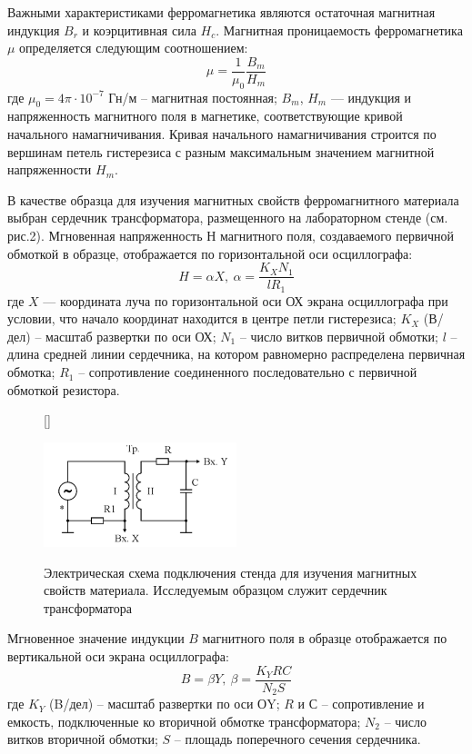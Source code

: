 \documentclass[12pt, a4paper]{article}
\begin{document}
Важными характеристиками ферромагнетика являются остаточная магнитная индукция $B_r$
и коэрцитивная сила $H_c$. Магнитная проницаемость ферромагнетика $\mu$ определяется
следующим соотношением:
\begin{equation}
\mu = \frac{1}{\mu_0}\frac{B_m}{H_m}
\end{equation}
где $\mu_0 = 4\pi \cdot 10^{-7}$ Гн/м – магнитная постоянная; $B_m$, $H_m$ —
индукция и напряженность магнитного поля в магнетике, соответствующие кривой
начального намагничивания. Кривая начального намагничивания строится по
вершинам петель гистерезиса с разным максимальным значением магнитной
напряженности $H_m$.

В качестве образца для изучения магнитных свойств ферромагнитного
материала выбран сердечник трансформатора, размещенного на лабораторном
стенде (см. рис.2). Мгновенная напряженность $Н$ магнитного поля,
создаваемого первичной обмоткой в образце, отображается по горизонтальной
оси осциллографа:
\begin{equation}
H = \alpha X,\ \alpha = \frac{K_X N_1}{l R_1}
\end{equation}
где $X$ — координата луча по горизонтальной оси ОХ экрана осциллографа при условии,
что начало координат находится в центре петли гистерезиса; $K_X$ (В/дел) – масштаб
развертки по оси ОХ; $N_1$ – число витков первичной обмотки; $l$ – длина
средней линии сердечника, на котором равномерно распределена первичная обмотка;
$R_1$ – сопротивление соединенного последовательно с первичной обмоткой резистора.

\begin{figure}[H]
[\FBwidth]
{\caption{Электрическая схема подключения стенда для изучения магнитных свойств материала.
Исследуемым образцом служит сердечник трансформатора}}
{\includegraphics[width=0.5\textwidth]{lab4_2.png}}
\end{figure}

Мгновенное значение индукции $B$ магнитного поля в образце отображается
по вертикальной оси экрана осциллографа:
\begin{equation}
B = \beta Y,\ \beta = \frac{K_Y RC}{N_2 S}
\end{equation}
где $K_Y$ (B/дел) – масштаб развертки по оси ОY; $R$ и $С$ –
сопротивление и емкость, подключенные ко вторичной обмотке трансформатора;
$N_2$ – число витков вторичной обмотки; $S$ – площадь
поперечного сечения сердечника.
\end{document}
